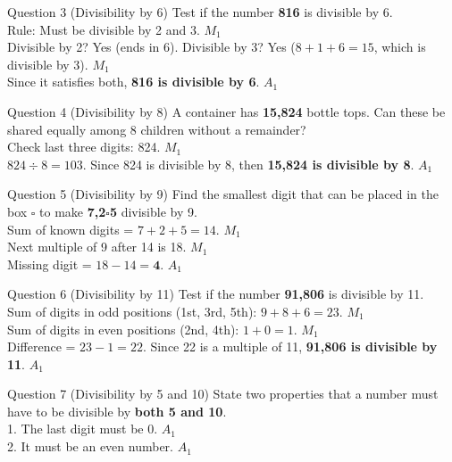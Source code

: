 \documentclass[12pt, a4paper, oneside]{article}
\begin{document}
\begin{solvingbox}{Question 3 (Divisibility by 6)}
Test if the number \textbf{816} is divisible by 6. \\
Rule: Must be divisible by 2 and 3. \hfill $M_1$ \\
Divisible by 2? Yes (ends in 6). Divisible by 3? Yes ($8+1+6=15$, which is divisible by 3). \hfill $M_1$ \\
Since it satisfies both, \textbf{816 is divisible by 6}. \hfill $A_1$
\end{solvingbox}

\begin{solvingbox}{Question 4 (Divisibility by 8)}
A container has \textbf{15,824} bottle tops. Can these be shared equally among 8 children without a remainder? \\
Check last three digits: 824. \hfill $M_1$ \\
$824 \div 8 = 103$. Since 824 is divisible by 8, then \textbf{15,824 is divisible by 8}. \hfill $A_1$
\end{solvingbox}

\begin{solvingbox}{Question 5 (Divisibility by 9)}
Find the smallest digit that can be placed in the box $\square$ to make \textbf{7,2$\square$5} divisible by 9. \\
Sum of known digits = $7 + 2 + 5 = 14$. \hfill $M_1$ \\
Next multiple of 9 after 14 is 18. \hfill $M_1$ \\
Missing digit = $18 - 14 = \mathbf{4}$. \hfill $A_1$
\end{solvingbox}

\begin{solvingbox}{Question 6 (Divisibility by 11)}
Test if the number \textbf{91,806} is divisible by 11. \\
Sum of digits in odd positions (1st, 3rd, 5th): $9 + 8 + 6 = 23$. \hfill $M_1$ \\
Sum of digits in even positions (2nd, 4th): $1 + 0 = 1$. \hfill $M_1$ \\
Difference = $23 - 1 = 22$. Since 22 is a multiple of 11, \textbf{91,806 is divisible by 11}. \hfill $A_1$
\end{solvingbox}

\begin{solvingbox}{Question 7 (Divisibility by 5 and 10)}
State two properties that a number must have to be divisible by \textbf{both 5 and 10}. \\
1. The last digit must be 0. \hfill $A_1$ \\
2. It must be an even number. \hfill $A_1$
\end{solvingbox}
\end{document}

